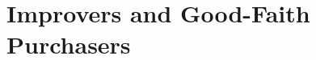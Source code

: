 \chapter{Improvers and Good-Faith Purchasers}







\begin{questions}

\end{questions}




\begin{questions}



\end{questions}





\begin{questions}



\end{questions}


